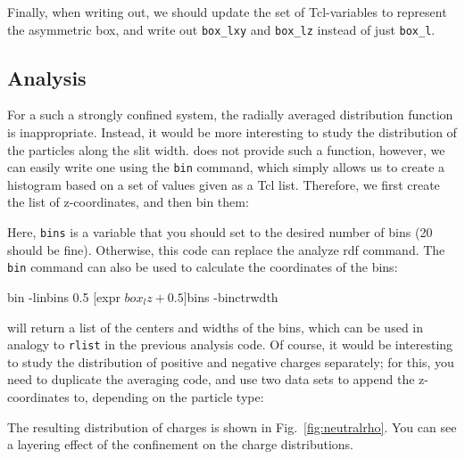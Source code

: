 \documentclass[
a4paper,                        %
11pt,                           %
twoside,                        %
footsepline,                    %
headsepline,                    %
headexclude,                    %
footexclude,                    %
pagesize,                       %
]{scrartcl}
\begin{document}
Finally, when writing out, we should update the set of
Tcl-variables to represent the asymmetric box, and write out
\verb|box_lxy| and \verb|box_lz| instead of just \verb|box_l|.

\subsection*{Analysis}

For a such a strongly confined system, the radially averaged
distribution function is inappropriate. Instead, it would be more
interesting to study the distribution of the particles along the slit
width. \es{}  does not provide such a function, however, we can easily
write one using the \verb|bin| command, which simply allows us 
to create a histogram based on a set of values given as a Tcl list.
Therefore, we first create the list
of z-coordinates, and then bin them:


Here, \verb|bins| is a variable that you should set to the desired
number of bins (20 should be fine). Otherwise, this code can replace
the analyze rdf command. The \verb|bin| command can also be used to
calculate the coordinates of the bins:

\begin{tclcode}
  bin -linbins 0.5 [expr $box_lz + 0.5] $bins -binctrwdth
\end{tclcode}

will return a list of the centers and widths of the bins, which can be
used in analogy to \verb|rlist| in the previous analysis code. Of
course, it would be interesting to study the distribution of positive
and negative charges separately; for this, you need to duplicate the
averaging code, and use two data sets to append the z-coordinates to,
depending on the particle type:


The resulting distribution of charges is shown in
Fig.~\ref{fig:neutralrho}. You can see a layering effect of the
confinement on the charge distributions.
\end{document}
